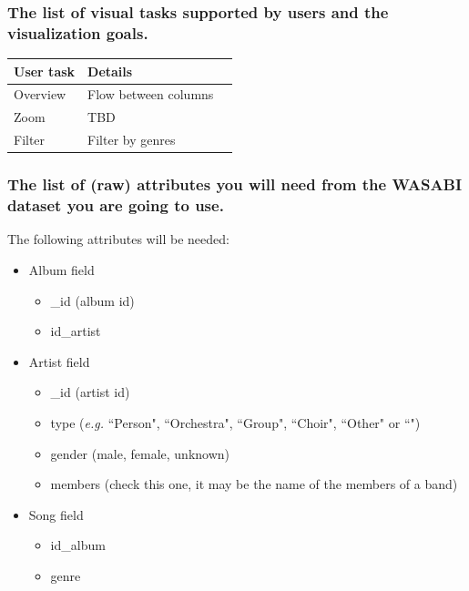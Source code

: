 \documentclass{article}
\begin{document}
\subsubsection*{The list of visual tasks supported by users and the visualization goals.}
\begin{center}
    \begin{tabular}{lll}
        \hline
        \multicolumn{1}{c}{\textbf{User task}} & \textbf{Details}     \\ \hline
        Overview                               & Flow between columns \\ \hline
        Zoom                                   & TBD                  \\ \hline
        Filter                                 & Filter by genres     \\
    \end{tabular}
\end{center}

\subsubsection*{The list of (raw) attributes you will need from the WASABI dataset you are going to use.}
The following attributes will be needed:
\begin{itemize}
    \item Album field
          \begin{itemize}
              \item \_id (album id)
              \item id\_artist
          \end{itemize}
    \item Artist field
          \begin{itemize}
              \item \_id (artist id)
              \item type (\textit{e.g.} ``Person", ``Orchestra", ``Group", ``Choir", ``Other" or ``")
              \item gender (male, female, unknown)
              \item members (check this one, it may be the name of the members of a band)
          \end{itemize}
    \item Song field
          \begin{itemize}
              \item id\_album
              \item genre
          \end{itemize}
\end{itemize}
\end{document}
